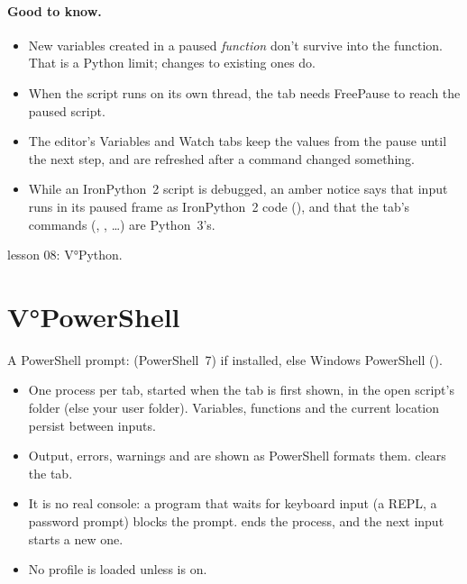 \paragraph{Good to know.}
\begin{itemize}
  \item New variables created in a paused \emph{function} don't survive into the function. That is a Python
        limit; changes to existing ones do.
  \item When the script runs on its own thread, the tab needs FreePause to reach the paused script.
  \item The editor's Variables and Watch tabs keep the values from the pause until the next step, and are
        refreshed after a command changed something.
  \item While an IronPython~2 script is debugged, an amber notice says that input runs in its paused frame as
        IronPython~2 code (), and that the tab's commands (, , …) are Python~3's.
\end{itemize}

\begin{lesson}{lesson 08}: V°Python.\end{lesson}

\section{V°PowerShell}\label{sec:vpowershell}

A PowerShell prompt:  (PowerShell~7) if installed, else Windows PowerShell ().

\begin{itemize}
  \item One process per tab, started when the tab is first shown, in the open script's folder (else your user
        folder). Variables, functions and the current location persist between inputs.
  \item Output, errors, warnings and  are shown as PowerShell formats them.  clears the tab.
  \item It is no real console: a program that waits for keyboard input (a REPL, a password prompt) blocks the
        prompt.  ends the process, and the next input starts a new one.
  \item No profile is loaded unless  is on.
\end{itemize}

